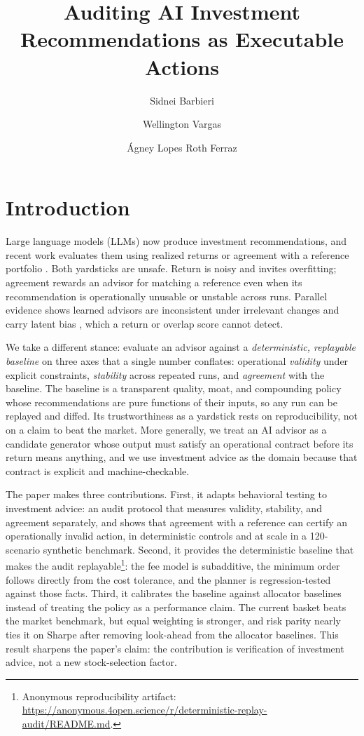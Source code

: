 \documentclass[sigconf,review,anonymous]{acmart}
\title{Auditing AI Investment Recommendations as Executable Actions}
\author{Sidnei Barbieri}
\affiliation{%
  \institution{Aeronautics Institute of Technology}
  \city{São José dos Campos}
  \state{SP}
  \country{Brazil}}
\author{Wellington Vargas}
\affiliation{%
  \institution{Portfel Financial Wealth}
  \city{Barueri}
  \state{SP}
  \country{Brazil}}
\author{Ágney Lopes Roth Ferraz}
\affiliation{%
  \institution{Aeronautics Institute of Technology}
  \city{São José dos Campos}
  \state{SP}
  \country{Brazil}}
\begin{document}
\maketitle

\section{Introduction}

Large language models (LLMs) now produce investment recommendations, and recent work evaluates them using realized returns or agreement with a reference portfolio \cite{oh2025alpha, spadea2025flarko}. Both yardsticks are unsafe. Return is noisy and invites overfitting; agreement rewards an advisor for matching a reference even when its recommendation is operationally unusable or unstable across runs. Parallel evidence shows learned advisors are inconsistent under irrelevant changes and carry latent bias \cite{chawla2025riskadvice, lee2025bias}, which a return or overlap score cannot detect.

We take a different stance: evaluate an advisor against a \emph{deterministic, replayable baseline} on three axes that a single number conflates: operational \emph{validity} under explicit constraints, \emph{stability} across repeated runs, and \emph{agreement} with the baseline. The baseline is a transparent quality, moat, and compounding policy whose recommendations are pure functions of their inputs, so any run can be replayed and diffed. Its trustworthiness as a yardstick rests on reproducibility, not on a claim to beat the market. More generally, we treat an AI advisor as a candidate generator whose output must satisfy an operational contract before its return means anything, and we use investment advice as the domain because that contract is explicit and machine-checkable.

The paper makes three contributions. First, it adapts behavioral testing to investment advice: an audit protocol that measures validity, stability, and agreement separately, and shows that agreement with a reference can certify an operationally invalid action, in deterministic controls and at scale in a 120-scenario synthetic benchmark. Second, it provides the deterministic baseline that makes the audit replayable\footnote{Anonymous reproducibility artifact: \url{https://anonymous.4open.science/r/deterministic-replay-audit/README.md}.}: the fee model is subadditive, the minimum order follows directly from the cost tolerance, and the planner is regression-tested against those facts. Third, it calibrates the baseline against allocator baselines instead of treating the policy as a performance claim. The current basket beats the market benchmark, but equal weighting is stronger, and risk parity nearly ties it on Sharpe after removing look-ahead from the allocator baselines. This result sharpens the paper's claim: the contribution is verification of investment advice, not a new stock-selection factor.
\end{document}
